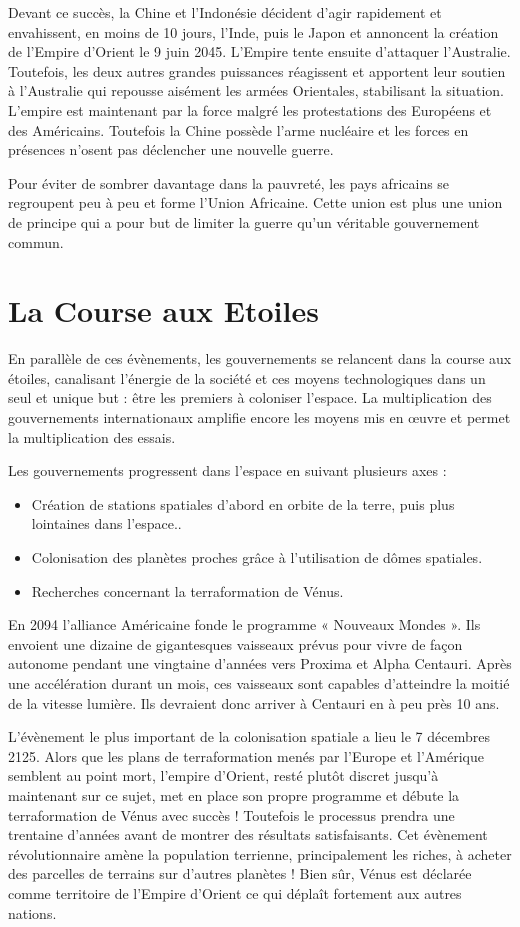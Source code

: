 \begin{multicols}{2}
Devant ce succès, la Chine et l’Indonésie décident d’agir rapidement et envahissent, en moins de 10 jours, l’Inde, puis le Japon et annoncent la création de l’Empire d’Orient le 9 juin 2045. L’Empire tente ensuite d’attaquer l’Australie. Toutefois, les deux autres grandes puissances réagissent et apportent leur soutien à l’Australie qui repousse aisément les armées Orientales, stabilisant la situation. L’empire est maintenant par la force malgré les protestations des Européens et des Américains. Toutefois la Chine possède l’arme nucléaire et les forces en présences n’osent pas déclencher une nouvelle guerre.

Pour éviter de sombrer davantage dans la pauvreté, les pays africains se regroupent peu à peu et forme l’Union Africaine. Cette union est plus une union de principe qui a pour but de limiter la guerre qu’un véritable gouvernement commun.

\section{La Course aux Etoiles}

En parallèle de ces évènements, les gouvernements se relancent dans la course aux étoiles, canalisant l’énergie de la société et ces moyens technologiques dans un seul et unique but : être les premiers à coloniser l’espace. La multiplication des gouvernements internationaux amplifie encore les moyens mis en œuvre et permet la multiplication des essais.

Les gouvernements progressent dans l’espace en suivant plusieurs axes :
\begin{itemize}
	\item Création de stations spatiales d’abord en orbite de la terre, puis plus lointaines dans l’espace..
	\item Colonisation des planètes proches grâce à l’utilisation de dômes spatiales.
	\item Recherches concernant la terraformation de Vénus. 
\end{itemize}


En 2094 l’alliance Américaine fonde le programme « Nouveaux Mondes ». Ils envoient une dizaine de gigantesques vaisseaux prévus pour vivre de façon autonome pendant une vingtaine d’années vers Proxima et Alpha Centauri. Après une accélération durant un mois, ces vaisseaux sont capables d’atteindre la moitié de la vitesse lumière. Ils devraient donc arriver à Centauri en à peu près 10 ans.

L’évènement le plus important de la colonisation spatiale a lieu le 7 décembres 2125. Alors que les plans de terraformation menés par l’Europe et l’Amérique semblent au point mort, l’empire d’Orient, resté plutôt discret jusqu’à maintenant sur ce sujet, met en place son propre programme et débute la terraformation de Vénus avec succès ! Toutefois le processus prendra une trentaine d’années avant de montrer des résultats satisfaisants. Cet évènement révolutionnaire amène la population terrienne, principalement les riches, à acheter des parcelles de terrains sur d’autres planètes ! Bien sûr, Vénus est déclarée comme territoire de l’Empire d’Orient ce qui déplaît fortement aux autres nations.


\end{multicols}
